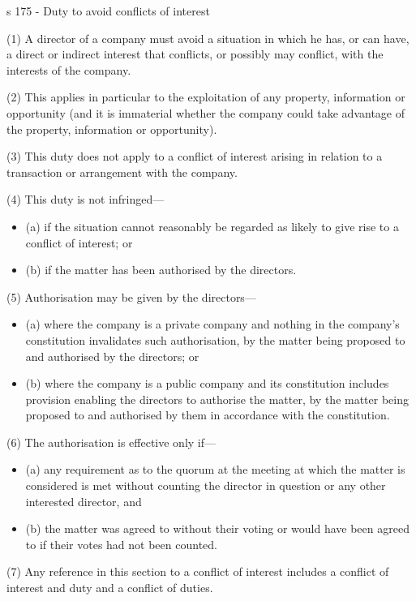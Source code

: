 \documentclass[
]{article}
\providecommand{\tightlist}{%
  \setlength{\itemsep}{0pt}\setlength{\parskip}{0pt}}
\newenvironment{env-136e818f-6bd8-45c9-b7d8-e6b8925f9e62}
{
    \savenotes\tcolorbox[blanker,breakable,left=5pt,borderline west={2pt}{-4pt}{green}]
}
{
    \endtcolorbox\spewnotes
}
\begin{document}
\begin{env-136e818f-6bd8-45c9-b7d8-e6b8925f9e62}

s 175 - Duty to avoid conflicts of interest

(1) A director of a company must avoid a situation in which he has, or
can have, a direct or indirect interest that conflicts, or possibly may
conflict, with the interests of the company.

(2) This applies in particular to the exploitation of any property,
information or opportunity (and it is immaterial whether the company
could take advantage of the property, information or opportunity).

(3) This duty does not apply to a conflict of interest arising in
relation to a transaction or arrangement with the company.

(4) This duty is not infringed---

\begin{itemize}
\tightlist
\item
  (a) if the situation cannot reasonably be regarded as likely to give
  rise to a conflict of interest; or
\item
  (b) if the matter has been authorised by the directors.
\end{itemize}

(5) Authorisation may be given by the directors---

\begin{itemize}
\tightlist
\item
  (a) where the company is a private company and nothing in the
  company's constitution invalidates such authorisation, by the matter
  being proposed to and authorised by the directors; or
\item
  (b) where the company is a public company and its constitution
  includes provision enabling the directors to authorise the matter, by
  the matter being proposed to and authorised by them in accordance with
  the constitution.
\end{itemize}

(6) The authorisation is effective only if---

\begin{itemize}
\tightlist
\item
  (a) any requirement as to the quorum at the meeting at which the
  matter is considered is met without counting the director in question
  or any other interested director, and
\item
  (b) the matter was agreed to without their voting or would have been
  agreed to if their votes had not been counted.
\end{itemize}

(7) Any reference in this section to a conflict of interest includes a
conflict of interest and duty and a conflict of duties.

\end{env-136e818f-6bd8-45c9-b7d8-e6b8925f9e62}
\end{document}
